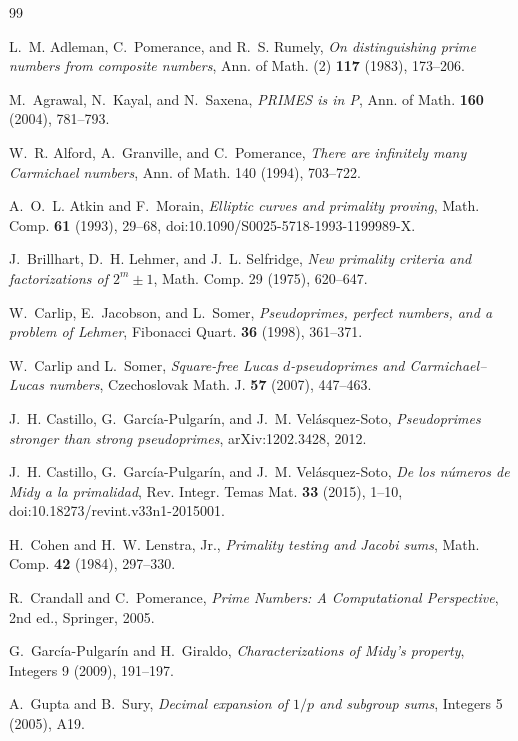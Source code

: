 \documentclass[11pt]{article}
\begin{document}
\begin{thebibliography}{99}

L.~M. Adleman, C.~Pomerance, and R.~S. Rumely,
\emph{On distinguishing prime numbers from composite numbers},
Ann. of Math. (2) \textbf{117} (1983), 173--206.

M.~Agrawal, N.~Kayal, and N.~Saxena,
\emph{PRIMES is in P},
Ann. of Math. \textbf{160} (2004), 781--793.

W.~R. Alford, A.~Granville, and C.~Pomerance,
\emph{There are infinitely many Carmichael numbers},
Ann. of Math. 140 (1994), 703--722.

A.~O.~L. Atkin and F.~Morain,
\emph{Elliptic curves and primality proving},
Math. Comp. \textbf{61} (1993), 29--68,
doi:10.1090/S0025-5718-1993-1199989-X.

J.~Brillhart, D.~H. Lehmer, and J.~L. Selfridge,
\emph{New primality criteria and factorizations of $2^m\pm1$},
Math. Comp. 29 (1975), 620--647.

W.~Carlip, E.~Jacobson, and L.~Somer,
\emph{Pseudoprimes, perfect numbers, and a problem of Lehmer},
Fibonacci Quart. \textbf{36} (1998), 361--371.

W.~Carlip and L.~Somer,
\emph{Square-free Lucas $d$-pseudoprimes and Carmichael--Lucas numbers},
Czechoslovak Math. J. \textbf{57} (2007), 447--463.

J.~H. Castillo, G.~Garc\'ia-Pulgar\'in, and J.~M. Vel\'asquez-Soto,
\emph{Pseudoprimes stronger than strong pseudoprimes},
arXiv:1202.3428, 2012.

J.~H. Castillo, G.~Garc\'ia-Pulgar\'in, and J.~M. Vel\'asquez-Soto,
\emph{De los n\'umeros de Midy a la primalidad},
Rev. Integr. Temas Mat. \textbf{33} (2015), 1--10,
doi:10.18273/revint.v33n1-2015001.

H.~Cohen and H.~W. Lenstra, Jr.,
\emph{Primality testing and Jacobi sums},
Math. Comp. \textbf{42} (1984), 297--330.

R.~Crandall and C.~Pomerance,
\emph{Prime Numbers: A Computational Perspective},
2nd ed., Springer, 2005.

G.~Garc\'ia-Pulgar\'in and H.~Giraldo,
\emph{Characterizations of Midy's property},
Integers 9 (2009), 191--197.

A.~Gupta and B.~Sury,
\emph{Decimal expansion of $1/p$ and subgroup sums},
Integers 5 (2005), A19.


\end{thebibliography}
\end{document}
